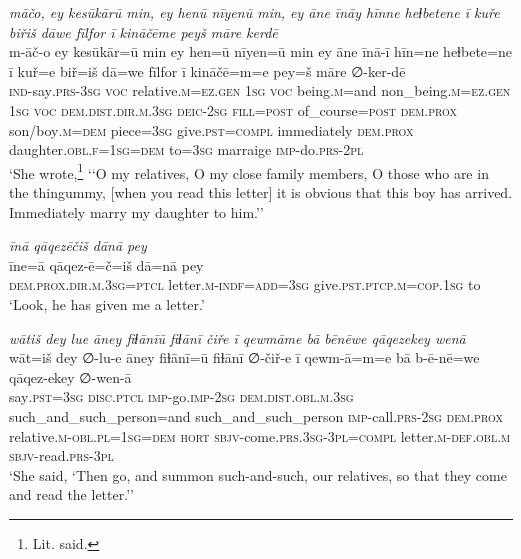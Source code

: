 \ea \label{KŠ.80}
\textit{māčo, ey kesūkārū min, ey henū nīyenū min, ey āne īnāy hīnne heɫbetene ī kuře biřiš dāwe fīlfor ī kināčēme peyš māre kerdē} \\ 
\gll m-āč-o ey kesūkār=ū min ey hen=ū nīyen=ū min ey āne īnā-ī hīn=ne heɫbete=ne ī kuř=e biř=iš dā=we fīlfor ī kināčē=m=e pey=š māre ∅-ker-dē \\ 
 \textsc{ind-}say\textsc{.prs}\textsc{-3sg} \textsc{voc} relative\textsc{.m}\textsc{\textsc{=ez.gen}} \textsc{1sg} \textsc{voc} being\textsc{.m}=and non\_being\textsc{.m}\textsc{\textsc{=ez.gen}} \textsc{1sg} \textsc{voc} \textsc{dem.dist}\textsc{.dir}\textsc{.m}\textsc{.3sg} \textsc{deic}-\textsc{2sg} \textsc{fill}\textsc{=\textsc{post}} of\_course\textsc{=\textsc{post}} \textsc{dem.prox} son/boy\textsc{.m}\textsc{=dem} piece\textsc{=3sg} give\textsc{.pst}\textsc{=compl} immediately \textsc{dem.prox} daughter\textsc{.obl}\textsc{.f}\textsc{=\textsc{1sg}}\textsc{=dem} to\textsc{=3sg} marraige \textsc{imp-}do\textsc{.prs}-\textsc{2pl} \\ 
\glt `She wrote,\footnote{Lit. said.} ‘‘O my relatives, O my close family members, O those who are in the thingummy, [when you read this letter] it is obvious that this boy has arrived. Immediately marry my daughter to him.’'
\z 
 
\ea \label{KŠ.84}
\textit{īnā qāqezēčiš dānā pey} \\ 
\gll īne=ā qāqez-ē=č=iš dā=nā pey \\ 
 \textsc{dem.prox}\textsc{.dir}\textsc{.m}\textsc{.3sg}=\textsc{ptcl} letter\textsc{.m}\textsc{-indf}\textsc{=add}\textsc{=3sg} give\textsc{.pst}\textsc{.ptcp}\textsc{.m}\textsc{=cop}\textsc{.\textsc{1sg}} to \\ 
\glt `Look, he has given me a letter.'
\z 
 
\ea \label{KŠ.86}
\textit{wātiš dey lue āney fiɫānīū fiɫānī čiře ī qewmāme bā bēnēwe qāqezekey wenā} \\ 
\gll wāt=iš dey ∅-lu-e āney fiɫānī=ū fiɫānī ∅-čiř-e ī qewm-ā=m=e bā b-ē-nē=we qāqez-ekey ∅-wen-ā \\ 
 say\textsc{.pst}\textsc{=3sg} \textsc{disc.ptcl} \textsc{imp-}go.\textsc{imp-}\textsc{2sg} \textsc{dem.dist}\textsc{.obl}\textsc{.m}\textsc{.3sg} such\_and\_such\_person=and such\_and\_such\_person \textsc{imp-}call\textsc{.prs}-\textsc{2sg} \textsc{dem.prox} relative\textsc{.m}\textsc{-obl}\textsc{.pl}\textsc{=\textsc{1sg}}\textsc{=dem} \textsc{hort} \textsc{sbjv-}come\textsc{.prs}\textsc{.3sg}\textsc{-3pl}\textsc{=compl} letter\textsc{.m}\textsc{-def}\textsc{.obl}\textsc{.m} \textsc{sbjv-}read\textsc{.prs}\textsc{-3pl} \\ 
\glt `She said, ‘Then go, and summon such-and-such, our relatives, so that they come and read the letter.’'
\z 
 
